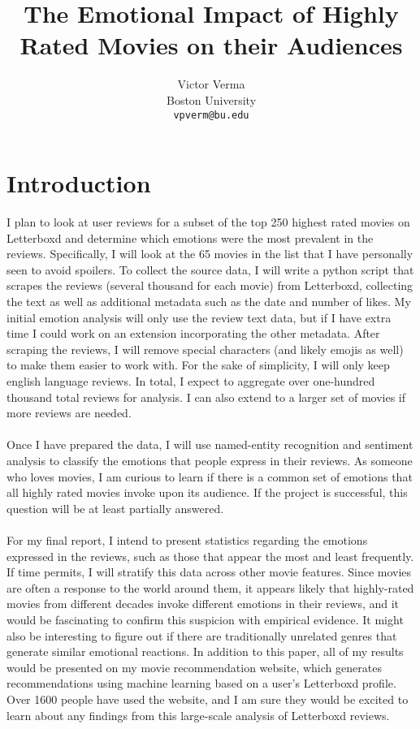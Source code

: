 \documentclass[11pt]{article}
\title{The Emotional Impact of Highly Rated Movies on their Audiences}
\author{Victor Verma \\
  Boston University \\
  \texttt{vpverm@bu.edu}}
\begin{document}
\maketitle
\begin{abstract}
\end{abstract}

\section{Introduction}
I plan to look at user reviews for a subset of the top 250 highest rated movies on Letterboxd and determine which emotions were the most prevalent in the reviews. Specifically, I will look at the 65 movies in the list that I have personally seen to avoid spoilers. To collect the source data, I will write a python script that scrapes the reviews (several thousand for each movie) from Letterboxd, collecting the text as well as additional metadata such as the date and number of likes. My initial emotion analysis will only use the review text data, but if I have extra time I could work on an extension incorporating the other metadata. After scraping the reviews, I will remove special characters (and likely emojis as well) to make them easier to work with. For the sake of simplicity, I will only keep english language reviews. In total, I expect to aggregate over one-hundred thousand total reviews for analysis. I can also extend to a larger set of movies if more reviews are needed. \\ \\
Once I have prepared the data, I will use named-entity recognition and sentiment analysis to classify the emotions that people express in their reviews. As someone who loves movies, I am curious to learn if there is a common set of emotions that all highly rated movies invoke upon its audience. If the project is successful, this question will be at least partially answered. \\ \\
For my final report, I intend to present statistics regarding the emotions expressed in the reviews, such as those that appear the most and least frequently. If time permits, I will stratify this data across other movie features. Since movies are often a response to the world around them, it appears likely that highly-rated movies from different decades invoke different emotions in their reviews, and it would be fascinating to confirm this suspicion with empirical evidence. It might also be interesting to figure out if there are traditionally unrelated genres that generate similar emotional reactions. In addition to this paper, all of my results would be presented on my movie recommendation website, which generates recommendations using machine learning based on a user's Letterboxd profile. Over 1600 people have used the website, and I am sure they would be excited to learn about any findings from this large-scale analysis of Letterboxd reviews.
\end{document}
